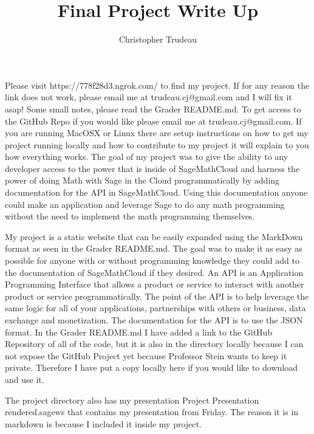 \documentclass{article}
\title{Final Project Write Up}
\author{Christopher Trudeau}
\begin{document}
\maketitle
\newpage
\begin{flushleft}
Please visit https://778f28d3.ngrok.com/ to find my project. If for any reason the link does not work, please email me at trudeau.cj@gmail.com and I will fix it asap! Some small notes, please read the Grader README.md. To get access to the GitHub Repo if you would like please email me at trudeau.cj@gmail.com. If you are running MacOSX or Linux there are setup instructions on how to get my project running locally and how to contribute to my project it will explain to you how everything works. The goal of my project was to give the ability to any developer access to the power that is inside of SageMathCloud and harness the power of doing Math with Sage in the Cloud programmatically by adding documentation for the API in SageMathCloud. Using this documentation anyone could make an application and leverage Sage to do any math programming without the need to implement the math programming themselves. 
\end{flushleft}
\begin{flushleft}
My project is a static website that can be easily expanded using the MarkDown format as seen in the Grader README.md. The goal was to make it as easy as possible for anyone with or without programming knowledge they could add to the documentation of SageMathCloud if they desired. An API is an Application Programming Interface that allows a product or service to interact with another product or service programmatically. The point of the API is to help leverage the same logic for all of your applications, partnerships with others or business, data exchange and monetization. The documentation for the API is to use the JSON format. In the Grader README.md I have added a link to the GitHub Repository of all of the code, but it is also in the directory locally because I can not expose the GitHub Project yet because Professor Stein wants to keep it private. Therefore I have put a copy locally here if you would like to download and use it. 
\end{flushleft}
\begin{flushleft}
The project directory also has my presentation Project Presentation rendered.sagews that contains my presentation from Friday. The reason it is in markdown is because I included it inside my project. 
\end{flushleft}
\end{document}
